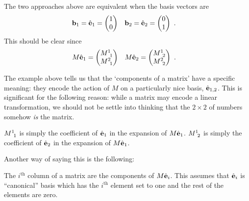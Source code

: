 \documentclass[12pt]{article}
\begin{document}
\begin{example}
The two approaches above are equivalent when the basis vectors are
\begin{align}
    \mathbf{b}_1 = {\hat{\mathbf{e}}}_1 &= \begin{pmatrix}
        1 \\ 0
    \end{pmatrix}
    &
    \mathbf{b}_2 = {\hat{\mathbf{e}}}_2 &= \begin{pmatrix}
        0 \\ 1
    \end{pmatrix}\ .
\end{align}
This should be clear since
\begin{align}
    M {\bas{e}}_1 &= 
    \begin{pmatrix}
        M\aij{1}{1} \\ M\aij{2}{1}
    \end{pmatrix}
    &
    M {\bas{e}}_2 &= 
    \begin{pmatrix}
        M\aij{1}{2} \\ M\aij{2}{2}
    \end{pmatrix} \ .
    \label{vec:Mhate:2}
\end{align}
\end{example}
The example above tells us that the `components of a matrix' have a specific meaning: they encode the action of $M$ on a particularly nice basis, ${\hat{\mathbf{e}}}_{1,2}$. This is significant for the following reason: while a matrix may encode a linear transformation, we should not be settle into thinking that the $2\times 2$ of numbers somehow \emph{is} the matrix.
\begin{example}
$M\aij 11$ is simply the coefficient of ${\hat{\mathbf{e}}}_1$ in the expansion of $M{\hat{\mathbf{e}}}_1$. $M\aij 12$ is simply the coefficient of ${\hat{\mathbf{e}}}_2$ in the expansion of $M{\hat{\mathbf{e}}}_1$. 
\end{example}
Another way of saying this is the following:
\begin{bigidea}
The $i^\text{th}$ column of a matrix are the components of $M\hat{\mathbf{e}}_i$. This assumes that $\hat{\mathbf{e}}_i$ is ``canonical'' basis which has the $i^\text{th}$ element set to one and the rest of the elements are zero.
\end{bigidea}



 
\end{document}
